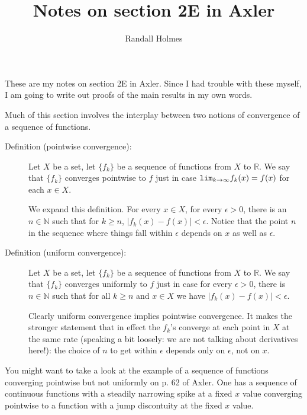 \documentclass[12pt]{article}
\title{Notes on section 2E in Axler}
\author{Randall Holmes}
\begin{document}
\maketitle

These are my notes on section 2E in Axler.  Since I had trouble with these myself, I am going to write out proofs of the main results in my own words.

Much of this section involves the interplay between two notions of convergence of a sequence of functions.

\begin{description}

\item[Definition (pointwise convergence):]  Let $X$ be a set, let $\{f_k\}$ be a sequence of functions from $X$ to $\mathbb R$.  We say that $\{f_k\}$ converges pointwise to
$f$ just in case ${\tt lim}_{k \rightarrow \infty}f_k(x) = f(x)$ for each $x \in X$.

We expand this definition.  For every $x \in X$, for every $\epsilon >0$, there is an $n \in \mathbb N$ such that for $k \geq n$, $|f_k(x) - f(x)|<\epsilon$.  Notice
that the point $n$ in the sequence where things fall within $\epsilon$ depends on $x$ as well as $\epsilon$.

\item[Definition (uniform convergence):]  Let $X$ be a set, let $\{f_k\}$ be a sequence of functions from $X$ to $\mathbb R$.  We say that $\{f_k\}$ converges uniformly to $f$ just in case for every $\epsilon>0$, there is $n \in \mathbb N$ such that for all $k \geq n$ and $x \in X$ we have $|f_k(x)-f(x)| < \epsilon$.

Clearly uniform convergence implies pointwise convergence.  It makes the stronger statement that in effect the $f_k$'s converge at each point in $X$ at the same rate (speaking a bit loosely:  we are not talking about derivatives here!):  the choice of $n$ to get within $\epsilon$ depends only on $\epsilon$, not on $x$.

\end{description}

You might want to take a look at the example of a sequence of functions converging pointwise but not uniformly on p. 62 of Axler.  One has a sequence of continuous functions with a steadily narrowing spike at a fixed $x$ value converging pointwise to a function with a jump discontuity at the fixed $x$ value.
\end{document}
